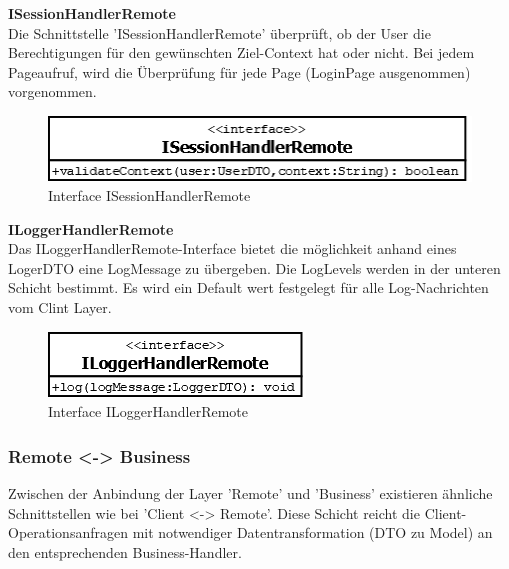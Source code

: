 \textbf{ISessionHandlerRemote}\\
Die Schnittstelle 'ISessionHandlerRemote' überprüft, ob der User die Berechtigungen für den gewünschten Ziel-Context hat oder nicht. Bei jedem Pageaufruf, wird die Überprüfung für jede Page (LoginPage ausgenommen) vorgenommen.
\begin{figure}[H]
	\includegraphics[width=0.5\linewidth]{Images/ISessionHandlerRemote}
	\caption{Interface ISessionHandlerRemote}
	\label{fig:if-ISessionHandlerRemote}
\end{figure}

\textbf{ILoggerHandlerRemote}\\
Das ILoggerHandlerRemote-Interface bietet die möglichkeit anhand eines LogerDTO eine LogMessage zu übergeben. Die LogLevels werden in der unteren Schicht bestimmt. Es wird ein Default wert festgelegt für alle Log-Nachrichten vom Clint Layer.
\begin{figure}[H]
	\includegraphics[width=0.5\linewidth]{Images/ILoggerHandlerRemote}
	\caption{Interface ILoggerHandlerRemote}
	\label{fig:if-ILoggerHandlerRemote}
\end{figure}







\subsubsection{Remote <-> Business}
Zwischen der Anbindung der Layer 'Remote' und 'Business' existieren ähnliche Schnittstellen wie bei 'Client <-> Remote'. Diese Schicht reicht die Client-Operationsanfragen mit notwendiger Datentransformation (DTO zu Model) an den entsprechenden Business-Handler.\\\\


